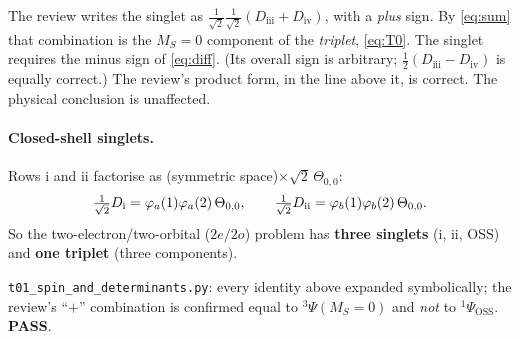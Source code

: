 \begin{caveatbox}
The review writes the singlet as $\tfrac1{\sqrt2}\tfrac1{\sqrt2}(D_{\text{iii}}+D_{\text{iv}})$, with a
\emph{plus} sign. By \cref{eq:sum} that combination is the $M_S=0$ component of the \emph{triplet},
\cref{eq:T0}. The singlet requires the minus sign of \cref{eq:diff}. (Its overall sign is arbitrary;
$\tfrac12(D_{\text{iii}}-D_{\text{iv}})$ is equally correct.) The review's product form, in the line
above it, is correct. The physical conclusion is unaffected.
\end{caveatbox}

\paragraph{Closed-shell singlets.} Rows i and ii factorise as (symmetric space)$\times\sqrt2\,\Theta_{0,0}$:
\[
  \tfrac1{\sqrt2}D_{\text{i}}=\varphi_a(1)\varphi_a(2)\,\Theta_{0,0},\qquad \tfrac1{\sqrt2}D_{\text{ii}}=\varphi_b(1)\varphi_b(2)\,\Theta_{0,0}.
\]
So the two-electron/two-orbital ($2e/2o$) problem has \textbf{three singlets} (i, ii, OSS) and \textbf{one
triplet} (three components).

\begin{verifybox}
\texttt{t01\_spin\_and\_determinants.py}: every identity above expanded symbolically; the review's
``$+$'' combination is confirmed equal to $^3\Psi(M_S=0)$ and \emph{not} to $^1\Psi_{\text{OSS}}$. \textbf{PASS}.
\end{verifybox}
